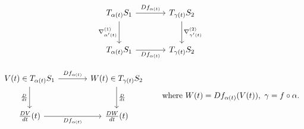 \documentclass[12pt,a4paper]{article}
\theoremstyle{plain}
\theoremstyle{definition}      %
\begin{document}
	\[
	\begin{tikzcd}[column sep=large, row sep=large]
		T_{\alpha(t)}S_1 \arrow[r,"Df_{\alpha(t)}"] \arrow[d,"\nabla^{(1)}_{\alpha'(t)}"'] &
		T_{\gamma(t)}S_2 \arrow[d,"\nabla^{(2)}_{\gamma'(t)}"] \\
		T_{\alpha(t)}S_1 \arrow[r,"Df_{\alpha(t)}"'] &
		T_{\gamma(t)}S_2
	\end{tikzcd}
	\]
	
	\[
	\begin{tikzcd}[column sep=large, row sep=large]
		V(t)\in T_{\alpha(t)}S_1 \arrow[r, "Df_{\alpha(t)}"] \arrow[d, "\frac{D}{dt}"'] &
		W(t)\in T_{\gamma(t)}S_2 \arrow[d, "\frac{D}{dt}"] \\
		\frac{DV}{dt}(t) \arrow[r, "Df_{\alpha(t)}"'] &
		\frac{DW}{dt}(t)
	\end{tikzcd}
	\qquad
	\text{where } W(t)=Df_{\alpha(t)}(V(t)),\ \gamma=f\circ\alpha.
	\]
	
\end{document}
